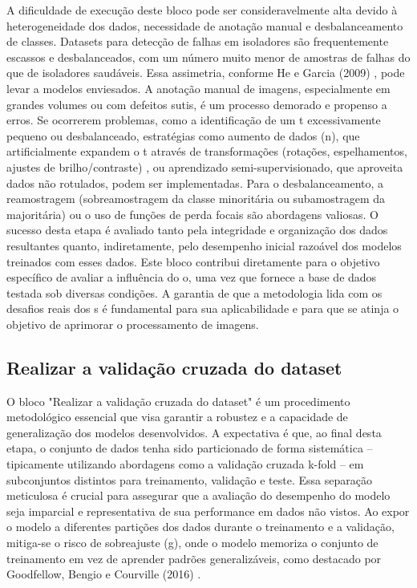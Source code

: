 A dificuldade de execução deste bloco pode ser consideravelmente alta devido à heterogeneidade dos dados, necessidade de anotação manual e desbalanceamento de classes. Datasets para detecção de falhas em isoladores são frequentemente escassos e desbalanceados, com um número muito menor de amostras de falhas do que de isoladores saudáveis. Essa assimetria, conforme He e Garcia (2009) \cite{He2009}, pode levar a modelos enviesados. A anotação manual de imagens, especialmente em grandes volumes ou com defeitos sutis, é um processo demorado e propenso a erros. Se ocorrerem problemas, como a identificação de um t excessivamente pequeno ou desbalanceado, estratégias como aumento de dados (n), que artificialmente expandem o t através de transformações (rotações, espelhamentos, ajustes de brilho/contraste) \cite{Shorten2019}, ou aprendizado semi-supervisionado, que aproveita dados não rotulados, podem ser implementadas. Para o desbalanceamento, a reamostragem (sobreamostragem da classe minoritária ou subamostragem da majoritária) ou o uso de funções de perda focais são abordagens valiosas. O sucesso desta etapa é avaliado tanto pela integridade e organização dos dados resultantes quanto, indiretamente, pelo desempenho inicial razoável dos modelos treinados com esses dados. Este bloco contribui diretamente para o objetivo específico de avaliar a influência do o, uma vez que fornece a base de dados testada sob diversas condições. A garantia de que a metodologia lida com os desafios reais dos s é fundamental para sua aplicabilidade e para que se atinja o objetivo de aprimorar o processamento de imagens.

\subsection{Realizar a validação cruzada do dataset}
O bloco "Realizar a validação cruzada do dataset" é um procedimento metodológico essencial que visa garantir a robustez e a capacidade de generalização dos modelos desenvolvidos. A expectativa é que, ao final desta etapa, o conjunto de dados tenha sido particionado de forma sistemática -- tipicamente utilizando abordagens como a validação cruzada k-fold -- em subconjuntos distintos para treinamento, validação e teste. Essa separação meticulosa é crucial para assegurar que a avaliação do desempenho do modelo seja imparcial e representativa de sua performance em dados não vistos. Ao expor o modelo a diferentes partições dos dados durante o treinamento e a validação, mitiga-se o risco de sobreajuste (g), onde o modelo memoriza o conjunto de treinamento em vez de aprender padrões generalizáveis, como destacado por Goodfellow, Bengio e Courville (2016) \cite{Goodfellow2016}.

